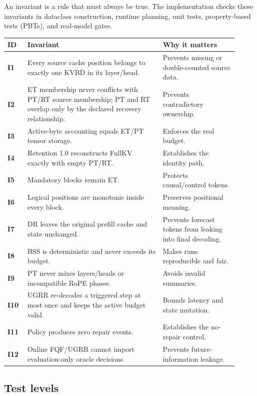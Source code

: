 \documentclass[11pt]{article}
\newcommand{\code}[1]{\texttt{\detokenize{#1}}}
\begin{document}
An invariant is a rule that must always be true. The implementation checks these invariants in
dataclass construction, runtime planning, unit tests, property-based tests (PBTs), and real-model
gates.

\begin{longtable}{>{\bfseries}p{0.08\linewidth}p{0.54\linewidth}p{0.30\linewidth}}
\toprule
ID & Invariant & Why it matters \\
\midrule
\endhead
I1 & Every source cache position belongs to exactly one KVBD in its layer/head. & Prevents missing
or double-counted source data. \\
I2 & ET membership never conflicts with PT/RT source membership; PT and RT overlap only by the
declared recovery relationship. & Prevents contradictory ownership. \\
I3 & Active-byte accounting equals ET/PT tensor storage. & Enforces the real budget. \\
I4 & Retention 1.0 reconstructs FullKV exactly with empty PT/RT. & Establishes the identity path. \\
I5 & Mandatory blocks remain ET. & Protects causal/control tokens. \\
I6 & Logical positions are monotonic inside every block. & Preserves positional meaning. \\
I7 & DR leaves the original prefill cache and state unchanged. & Prevents forecast tokens from
leaking into final decoding. \\
I8 & BSS is deterministic and never exceeds its budget. & Makes runs reproducible and fair. \\
I9 & PT never mixes layers/heads or incompatible RoPE phases. & Avoids invalid summaries. \\
I10 & UGRR re-decodes a triggered step at most once and keeps the active budget valid. & Bounds
latency and state mutation. \\
I11 & Policy \code{none} produces zero repair events. & Establishes the no-repair control. \\
I12 & Online FQF/UGRR cannot import evaluation-only oracle decisions. & Prevents future-information
leakage. \\
\bottomrule
\end{longtable}

\subsection{Test levels}
\end{document}
